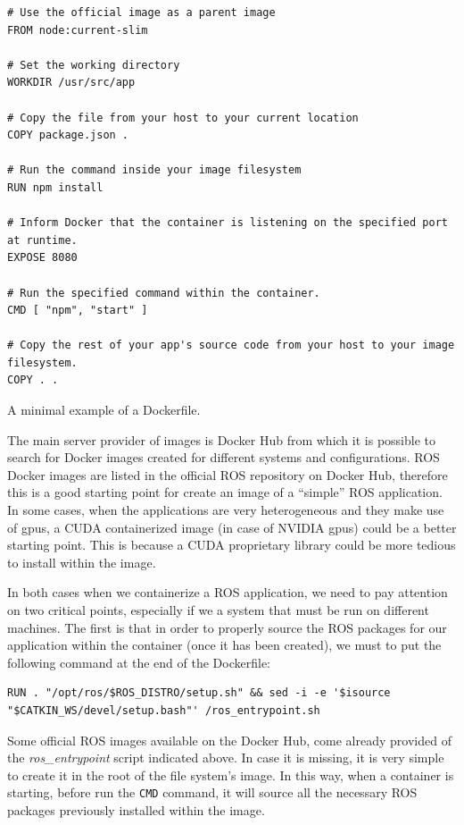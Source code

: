 \begin{listing}[htbp]
\begin{verbatim}
# Use the official image as a parent image
FROM node:current-slim

# Set the working directory
WORKDIR /usr/src/app

# Copy the file from your host to your current location
COPY package.json .

# Run the command inside your image filesystem
RUN npm install

# Inform Docker that the container is listening on the specified port at runtime.
EXPOSE 8080

# Run the specified command within the container.
CMD [ "npm", "start" ]

# Copy the rest of your app's source code from your host to your image filesystem.
COPY . .
\end{verbatim}
\caption{A minimal example of a Dockerfile.}
\label{lst:dockerfilesample}
\end{listing}

The main server provider of images is Docker Hub \cite{DockerHub} from which it is possible to search for Docker images created for different systems and configurations.
ROS Docker images are listed in the official ROS repository on Docker Hub, therefore this is a good starting point for create an image of a ``simple'' ROS application.
In some cases, when the applications are very heterogeneous and they make use of gpus, a CUDA containerized image (in case of NVIDIA gpus) could be a better starting point.
This is because a CUDA proprietary library could be more tedious to install within the image.

In both cases when we containerize a ROS application, we need to pay attention on two critical points, especially if we a system that must be run on different machines.
The first is that in order to properly source the ROS packages for our application within the container (once it has been created), we must to put the following command at the end of the Dockerfile:

\begin{verbatim}
RUN . "/opt/ros/$ROS_DISTRO/setup.sh" && sed -i -e '$isource "$CATKIN_WS/devel/setup.bash"' /ros_entrypoint.sh
\end{verbatim}


Some official ROS images available on the Docker Hub, come already provided of the \textit{ros\_entrypoint} script indicated above. In case it is missing, it is very simple to create it in the root of the file system's image. In this way, when a container is starting, before run the \texttt{CMD} command, it will source all the necessary ROS packages previously installed within the image.

